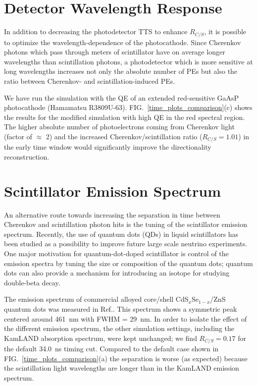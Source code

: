 \documentclass[aps,prc,twocolumn,groupedaddress,showpacs,amsmath,amssymb,floatfix,superscriptaddress]{revtex4}
\begin{document}
\section{Detector Wavelength Response}
\label{detector_wavelength_response_sec} 
In addition to decreasing the photodetector TTS to enhance $R_{C/S}$,
it is possible to optimize the wavelength-dependence of the
photocathode. Since Cherenkov photons which pass through meters of
scintillator have on average longer wavelengths than scintillation
photons, a photodetector which is more sensitive at long wavelengths
increases not only the absolute number of PEs but also the ratio
between Cherenkov- and scintillation-induced PEs.

We have run the simulation with the QE of an extended red-sensitive
GaAsP photocathode (Hamamatsu R3809U-63)\cite{Hamamatsu_R3899U}.
FIG.~\ref{time_plots_comparison}(c) shows the results for the
modified simulation with high QE in the red spectral region. The
higher absolute number of photoelectrons coming from Cherenkov light
(factor of $\approx$ 2) and the increased Cherenkov/scintillation
ratio ($R_{C/S}=1.01$) in the early time window would significantly improve the
directionality reconstruction.

\section{Scintillator Emission Spectrum}
\label{scintillator_emission_sec}
An alternative route towards increasing the separation in time between
Cherenkov and scintillation photon hits is the tuning of the
scintillator emission spectrum. Recently, the use of quantum dots
(QDs) in liquid scintillators has been studied as a possibility to
improve future large scale neutrino experiments\cite{qdot,qdot2}. One
major motivation for quantum-dot-doped scintillator is control of the
emission spectra by tuning the size or composition of the quantum
dots; quantum dots can also provide a mechanism for introducing an 
isotope for studying double-beta decay.  

The emission spectrum of commercial alloyed core/shell
CdS$_x$Se$_{1-x}$/ZnS quantum dots was measured in
Ref.\cite{qdot2}. This spectrum shows a symmetric peak centered
around 461~nm with FWHM = 29~nm.  In order to isolate the effect of
the different emission spectrum, the other simulation settings,
including the KamLAND absorption spectrum, were kept unchanged; we
find $R_{C/S}=0.17$ for the default 34.0~ns timing cut.  Compared to
the default case shown in FIG.~\ref{time_plots_comparison}(a) the
separation is worse (as expected) because the scintillation light
wavelengths are longer than in the KamLAND emission spectrum.
\end{document}
